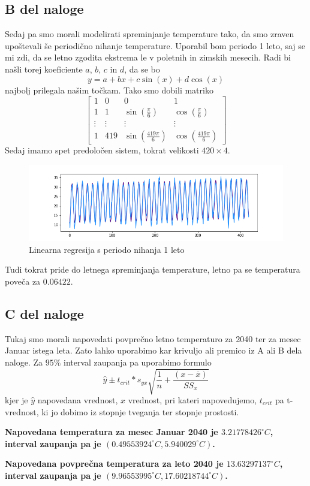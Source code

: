 \documentclass{article}
\begin{document}
    \subsection{B del naloge}
    Sedaj pa smo morali modelirati spreminjanje temperature tako, da smo zraven upoštevali še periodično nihanje temperature. Uporabil bom periodo 1 leto, saj se mi zdi, da se
    letno zgodita ekstrema le v poletnih in zimskih mesecih. Radi bi našli torej koeficiente $a$, $b$, $c$ in $d$, da se bo
    \[
        y = a + bx +c\sin(x)+d\cos(x)
    \]
    najbolj prilegala našim točkam. Tako smo dobili matriko
    \[
        \begin{bmatrix}
            1 & 0 & 0 & 1 \\
            1 & 1 & \sin(\frac{\pi}{6}) & \cos(\frac{\pi}{6}) \\
            \vdots & \vdots & \vdots & \vdots \\
            1 & 419 & \sin(\frac{419\pi}{6}) & \cos(\frac{419\pi}{6})
        \end{bmatrix}  
    \]
    Sedaj imamo spet predoločen sistem, tokrat velikosti $420\times4$.
    \begin{figure}[H]
        \begin{center}
            \includegraphics[scale=0.5]{../PythonKoda/NihLinReg.png}
            \caption{Linearna regresija s periodo nihanja 1 leto}
            \label{NLR}
        \end{center} 
    \end{figure}
    Tudi tokrat pride do letnega spreminjanja temperature, letno pa se temperatura poveča za $0.06422$.
    \subsection{C del naloge}
    Tukaj smo morali napovedati povprečno letno temperaturo za 2040 ter za mesec Januar istega leta. Zato lahko uporabimo kar krivuljo ali premico iz A ali B dela naloge. Za
    $95\%$ interval zaupanja pa uporabimo formulo
    \[
        \hat{y} \pm t_{crit} * s_{y x} \sqrt{\frac{1}{n} + \frac{(x - \overline{x})}{SS_{x}}}  
    \] 
    kjer je $\hat{y}$ napovedana vrednost, $x$ vrednost, pri kateri napovedujemo, $t_{crit}$ pa t-vrednost, ki jo dobimo iz stopnje tveganja ter stopnje prostosti.
    \par \textbf{Napovedana temperatura za mesec Januar 2040 je $3.21778426^\circ C$, interval zaupanja pa je $(0.49553924^\circ C, 5.940029^\circ C)$.}
    \par \textbf{Napovedana povprečna temperatura za leto 2040 je $13.63297137^\circ C$, interval zaupanja pa je $(9.96553995^\circ C, 17.60218744^\circ C)$.}
\end{document}
